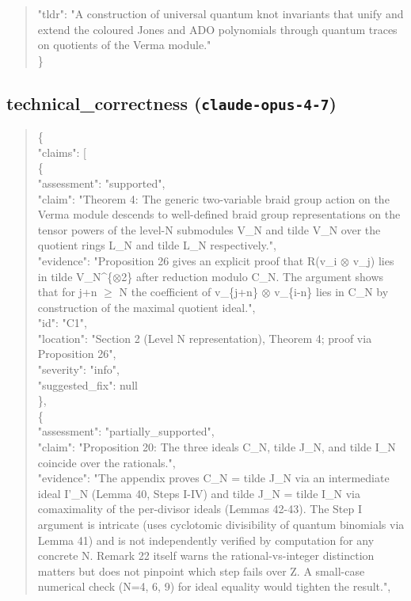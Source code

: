 \documentclass[11pt]{article}
\begin{document}
\begin{quote}
  "tldr": "A construction of universal quantum knot invariants that unify and extend the coloured Jones and ADO polynomials through quantum traces on quotients of the Verma module."\\
\}\\
\end{quote}

\subsection*{technical\_correctness (\texttt{claude-opus-4-7})}
\begin{quote}\small\ttfamily\raggedright
\{\\
  "claims": [\\
    \{\\
      "assessment": "supported",\\
      "claim": "Theorem 4: The generic two-variable braid group action on the Verma module descends to well-defined braid group representations on the tensor powers of the level-N submodules V\_N and tilde V\_N over the quotient rings L\_N and tilde L\_N respectively.",\\
      "evidence": "Proposition 26 gives an explicit proof that R(v\_i \ensuremath{\otimes} v\_j) lies in tilde V\_N\^{}\{\ensuremath{\otimes}2\} after reduction modulo C\_N. The argument shows that for j+n \ensuremath{\ge} N the coefficient of v\_\{j+n\} \ensuremath{\otimes} v\_\{i-n\} lies in C\_N by construction of the maximal quotient ideal.",\\
      "id": "C1",\\
      "location": "Section 2 (Level N representation), Theorem 4; proof via Proposition 26",\\
      "severity": "info",\\
      "suggested\_fix": null\\
    \},\\
    \{\\
      "assessment": "partially\_supported",\\
      "claim": "Proposition 20: The three ideals C\_N, tilde J\_N, and tilde I\_N coincide over the rationals.",\\
      "evidence": "The appendix proves C\_N = tilde J\_N via an intermediate ideal I'\_N (Lemma 40, Steps I-IV) and tilde J\_N = tilde I\_N via comaximality of the per-divisor ideals (Lemmas 42-43). The Step I argument is intricate (uses cyclotomic divisibility of quantum binomials via Lemma 41) and is not independently verified by computation for any concrete N. Remark 22 itself warns the rational-vs-integer distinction matters but does not pinpoint which step fails over Z. A small-case numerical check (N=4, 6, 9) for ideal equality would tighten the result.",\\

\end{quote}
\end{document}
